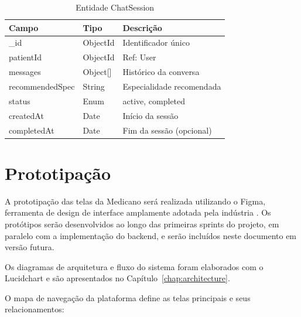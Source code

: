 \begin{table}[H]
  \centering
  \caption{Entidade ChatSession}
  \label{tab:entity-chat}
  \begin{tabular}{p{3cm}p{3cm}p{5.5cm}}
    \toprule
    \textbf{Campo} &
    \textbf{Tipo} &
    \textbf{Descrição} \\
    \midrule
    \_id             & ObjectId  & Identificador único \\
    patientId        & ObjectId  & Ref: User \\
    messages         & Object[]  & Histórico da conversa \\
    recommendedSpec  & String    & Especialidade recomendada \\
    status           & Enum      & active, completed \\
    createdAt        & Date      & Início da sessão \\
    completedAt      & Date      & Fim da sessão (opcional) \\
    \bottomrule
  \end{tabular}
\end{table}

\section{Prototipação}
\label{sec:prototyping}

A prototipação das telas da Medicano será realizada
utilizando o Figma, ferramenta de design de interface
amplamente adotada pela indústria \cite{figma2024}.
Os protótipos serão desenvolvidos ao longo das
primeiras sprints do projeto, em paralelo com a
implementação do backend, e serão incluídos neste
documento em versão futura.

Os diagramas de arquitetura e fluxo do sistema
foram elaborados com o Lucidchart e são apresentados
no Capítulo~\ref{chap:architecture}.

O mapa de navegação da plataforma define as telas
principais e seus relacionamentos:

